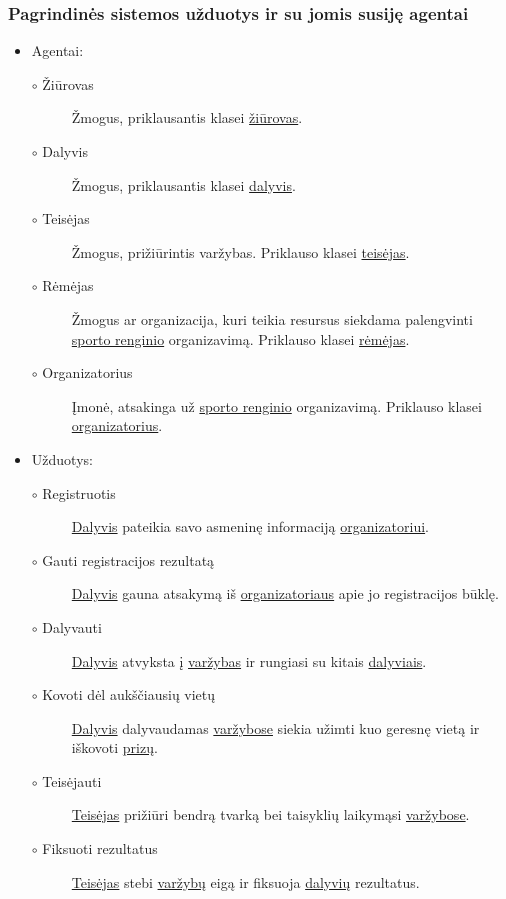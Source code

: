 \documentclass{VUMIFPSkursinis}
\begin{document}
    \subsubsection*{Pagrindinės sistemos užduotys ir su jomis susiję agentai} \label{vidineVersloProcesoAnalize_uzduotys_uzduotysIrAgentai}
      \renewcommand{\labelitemi}{$\bullet$}
      \renewcommand{\labelitemii}{$\circ$}
      \begin{itemize}
        \item Agentai:
          \begin{description}
            \item [$\circ$ Žiūrovas] Žmogus, priklausantis klasei \underline{žiūrovas}.
            \item [$\circ$ Dalyvis] Žmogus, priklausantis klasei \underline{dalyvis}.
            \item [$\circ$ Teisėjas] Žmogus, prižiūrintis varžybas. Priklauso klasei \underline{teisėjas}.
            \item [$\circ$ Rėmėjas] Žmogus ar organizacija, kuri teikia resursus siekdama palengvinti \underline{sporto renginio} organizavimą. Priklauso klasei \underline{rėmėjas}.
            \item [$\circ$ Organizatorius] Įmonė, atsakinga už \underline{sporto renginio} organizavimą. Priklauso klasei \underline{organizatorius}.
          \end{description}
        \item Užduotys:
          \begin{description}
            \item [$\circ$ Registruotis] \underline{Dalyvis} pateikia savo asmeninę informaciją \underline{organizatoriui}.
            \item [$\circ$ Gauti registracijos rezultatą] \underline{Dalyvis} gauna atsakymą iš \underline{organizatoriaus} apie jo registracijos būklę.
            \item [$\circ$ Dalyvauti] \underline{Dalyvis} atvyksta į \underline{varžybas} ir rungiasi su kitais \underline{dalyviais}.
            \item [$\circ$ Kovoti dėl aukščiausių vietų] \underline{Dalyvis} dalyvaudamas \underline{varžybose} siekia užimti kuo geresnę vietą ir iškovoti \underline{prizų}.
            \item [$\circ$ Teisėjauti] \underline{Teisėjas} prižiūri bendrą tvarką bei taisyklių laikymąsi \underline{varžybose}.
            \item [$\circ$ Fiksuoti rezultatus] \underline{Teisėjas} stebi \underline{varžybų} eigą ir fiksuoja \underline{dalyvių} rezultatus.

\end{description}
\end{itemize}
\end{document}
